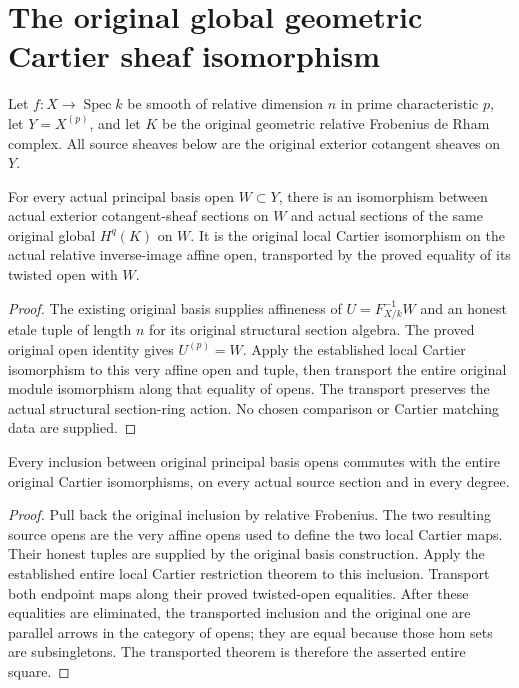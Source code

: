\section{The original global geometric Cartier sheaf isomorphism}

Let $f:X\to\operatorname{Spec}k$ be smooth of relative dimension $n$
in prime characteristic $p$, let $Y=X^{(p)}$, and let $K$ be the
original geometric relative Frobenius de Rham complex. All source
sheaves below are the original exterior cotangent sheaves on $Y$.

\begin{definition}
\label{def:cartier-geometric-principal-basis-isomorphism}
\leanok
For every actual principal basis open $W\subset Y$, there is an
isomorphism between actual exterior cotangent-sheaf sections on
$W$ and actual sections of the same original global $H^q(K)$ on
$W$. It is the original local Cartier isomorphism on the actual
relative inverse-image affine open, transported by the proved
equality of its twisted open with $W$.
\end{definition}
\begin{proof}
The existing original basis supplies affineness of
$U=F_{X/k}^{-1}W$ and an honest etale tuple of length $n$ for its
original structural section algebra. The proved original open
identity gives $U^{(p)}=W$. Apply the established local Cartier
isomorphism to this very affine open and tuple, then transport the
entire original module isomorphism along that equality of opens.
The transport preserves the actual structural section-ring action.
No chosen comparison or Cartier matching data are supplied.
\end{proof}

\begin{theorem}
\label{thm:cartier-geometric-principal-basis-naturality}
\leanok
Every inclusion between original principal basis opens commutes
with the entire original Cartier isomorphisms, on every actual
source section and in every degree.
\end{theorem}
\begin{proof}
Pull back the original inclusion by relative Frobenius. The two
resulting source opens are the very affine opens used to define
the two local Cartier maps. Their honest tuples are supplied by
the original basis construction. Apply the established entire
local Cartier restriction theorem to this inclusion. Transport
both endpoint maps along their proved twisted-open equalities.
After these equalities are eliminated, the transported inclusion
and the original one are parallel arrows in the category of
opens; they are equal because those hom sets are subsingletons.
The transported theorem is therefore the asserted entire square.
\end{proof}

